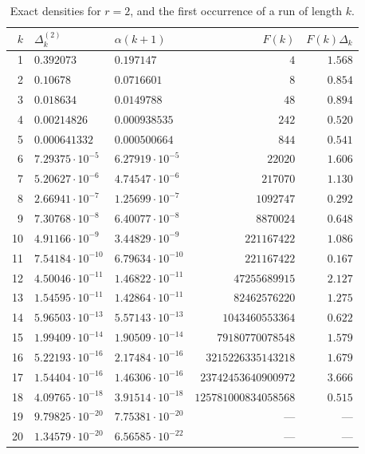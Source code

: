 \documentclass[10pt,a4paper]{amsart}
\numberwithin{equation}{section}
\begin{document}
\begin{table}[ht]
\caption{Exact densities for $r=2$, and the first occurrence of a run of length $k$.}
\label{tab:delta}
\begin{tabular}{rllrr}
\toprule
$k$ & $\Delta^{(2)}_k$ & $\alpha(k+1)$ & $F(k)$ & $F(k)\Delta_k$\\
\midrule
1 & $0.392073$ & $0.197147$ & $4$ & $1.568$ \\
2 & $0.10678$ & $0.0716601$ & $8$ & $0.854$ \\
3 & $0.018634$ & $0.0149788$ & $48$ & $0.894$ \\
4 & $0.00214826$ & $0.000938535$ & $242$ & $0.520$ \\
5 & $0.000641332$ & $0.000500664$ & $844$ & $0.541$ \\
6 & $7.29375\cdot10^{-5}$ & $6.27919\cdot10^{-5}$ & $22020$ & $1.606$ \\
7 & $5.20627\cdot10^{-6}$ & $4.74547\cdot10^{-6}$ & $217070$ & $1.130$ \\
8 & $2.66941\cdot10^{-7}$ & $1.25699\cdot10^{-7}$ & $1092747$ & $0.292$ \\
9 & $7.30768\cdot10^{-8}$ & $6.40077\cdot10^{-8}$ & $8870024$ & $0.648$ \\
10 & $4.91166\cdot10^{-9}$ & $3.44829\cdot10^{-9}$ & $221167422$ & $1.086$ \\
11 & $7.54184\cdot10^{-10}$ & $6.79634\cdot10^{-10}$ & $221167422$ & $0.167$ \\
12 & $4.50046\cdot10^{-11}$ & $1.46822\cdot10^{-11}$ & $47255689915$ & $2.127$ \\
13 & $1.54595\cdot10^{-11}$ & $1.42864\cdot10^{-11}$ & $82462576220$ & $1.275$ \\
14 & $5.96503\cdot10^{-13}$ & $5.57143\cdot10^{-13}$ & $1043460553364$ & $0.622$ \\
15 & $1.99409\cdot10^{-14}$ & $1.90509\cdot10^{-14}$ & $79180770078548$ & $1.579$ \\
16 & $5.22193\cdot10^{-16}$ & $2.17484\cdot10^{-16}$ & $3215226335143218$ & $1.679$ \\
17 & $1.54404\cdot10^{-16}$ & $1.46306\cdot10^{-16}$ & $23742453640900972$ & $3.666$ \\
18 & $4.09765\cdot10^{-18}$ & $3.91514\cdot10^{-18}$ & $125781000834058568$ & $0.515$ \\
19 & $9.79825\cdot10^{-20}$ & $7.75381\cdot10^{-20}$ & --- & --- \\
20 & $1.34579\cdot10^{-20}$ & $6.56585\cdot10^{-22}$ & --- & --- \\
\bottomrule
\end{tabular}
\end{table}
\end{document}
